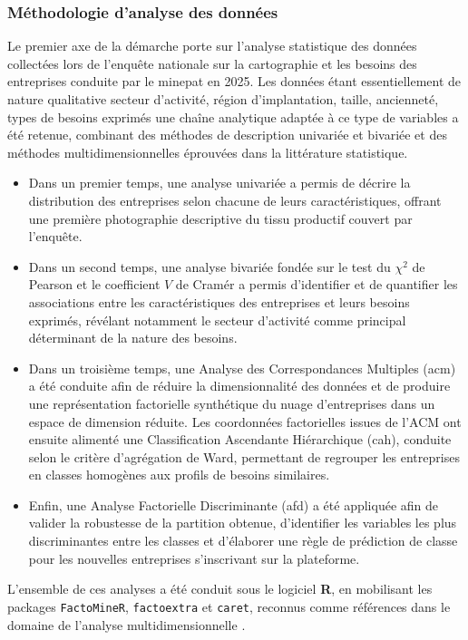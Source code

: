 \documentclass[12pt, a4paper, oneside]{report}
\begin{document}
	\subsubsection{Méthodologie d'analyse des données}
	Le premier axe de la démarche porte sur l'analyse statistique
	des données collectées lors de l'enquête nationale sur la
	cartographie et les besoins des entreprises conduite par le
	\gls{minepat} en 2025. Les données étant essentiellement de
	nature qualitative secteur d'activité, région d'implantation,
	taille, ancienneté, types de besoins exprimés une chaîne
	analytique adaptée à ce type de variables a été retenue,
	combinant des méthodes de description univariée et bivariée et
	des méthodes multidimensionnelles éprouvées dans la littérature
	statistique.
	\begin{itemize}
		\item Dans un premier temps, une analyse univariée a
		permis de décrire la distribution des entreprises selon chacune
		de leurs caractéristiques, offrant une première photographie
		descriptive du tissu productif couvert par l'enquête.
		\item Dans un
		second temps, une analyse bivariée fondée sur le test du
		$\chi^2$ de Pearson et le coefficient $V$ de Cramér a permis
		d'identifier et de quantifier les associations entre les
		caractéristiques des entreprises et leurs besoins exprimés,
		révélant notamment le secteur d'activité comme principal
		déterminant de la nature des besoins.
		\item Dans un troisième temps,
		une Analyse des Correspondances Multiples (\gls{acm}) a été
		conduite afin de réduire la dimensionnalité des données et de
		produire une représentation factorielle synthétique du nuage
		d'entreprises dans un espace de dimension réduite. Les
		coordonnées factorielles issues de l'ACM ont ensuite alimenté
		une Classification Ascendante Hiérarchique (\gls{cah}),
		conduite selon le critère d'agrégation de Ward, permettant de
		regrouper les entreprises en classes homogènes aux profils de
		besoins similaires.
		\item Enfin, une Analyse Factorielle Discriminante
		(\gls{afd}) a été appliquée afin de valider la robustesse de
		la partition obtenue, d'identifier les variables les plus
		discriminantes entre les classes et d'élaborer une règle de
		prédiction de classe pour les nouvelles entreprises s'inscrivant
		sur la plateforme.
	\end{itemize}
	L'ensemble de ces analyses a été conduit sous
	le logiciel \textbf{R}, en mobilisant les packages
	\texttt{FactoMineR}, \texttt{factoextra} et \texttt{caret},
	reconnus comme références dans le domaine de l'analyse
	multidimensionnelle \citep{husson_le_pages_2009}.
	
\end{document}
